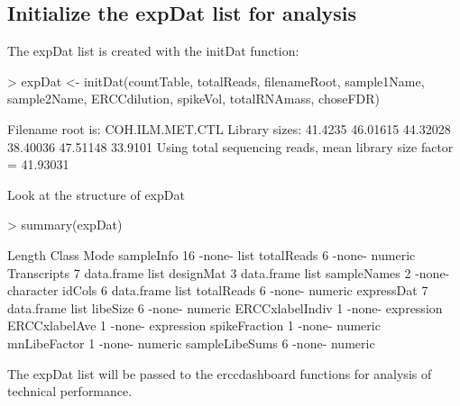 \documentclass{article}
\begin{document}
\subsection{Initialize the expDat list for analysis}
The expDat list is created with the initDat function:
\begin{Schunk}
\begin{Sinput}
> expDat <- initDat(countTable, totalReads, filenameRoot, sample1Name,
                    sample2Name, ERCCdilution, spikeVol, totalRNAmass, choseFDR)
\end{Sinput}
\begin{Soutput}
Filename root is: COH.ILM.MET.CTL 
Library sizes:
41.4235 46.01615 44.32028 38.40036 47.51148 33.9101
Using total sequencing reads,
 mean library size factor = 41.93031
\end{Soutput}
\end{Schunk}
Look at the structure of expDat
\begin{Schunk}
\begin{Sinput}
> summary(expDat)
\end{Sinput}
\begin{Soutput}
                Length Class      Mode      
sampleInfo      16     -none-     list      
totalReads       6     -none-     numeric   
Transcripts      7     data.frame list      
designMat        3     data.frame list      
sampleNames      2     -none-     character 
idCols           6     data.frame list      
totalReads       6     -none-     numeric   
expressDat       7     data.frame list      
libeSize         6     -none-     numeric   
ERCCxlabelIndiv  1     -none-     expression
ERCCxlabelAve    1     -none-     expression
spikeFraction    1     -none-     numeric   
mnLibeFactor     1     -none-     numeric   
sampleLibeSums   6     -none-     numeric   
\end{Soutput}
\end{Schunk}
The expDat list will be passed to the erccdashboard functions for analysis of 
technical performance.
\end{document}
